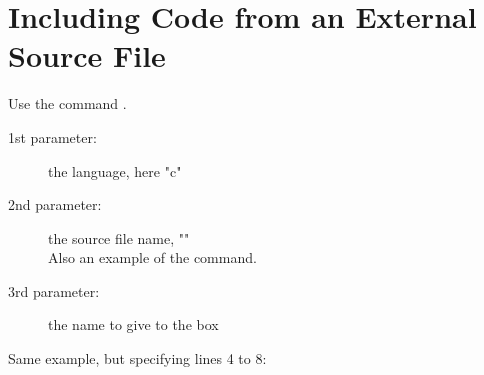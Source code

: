 \section{Including Code from an External Source File}

Use the command .
\begin{description}
	\item[1st parameter:] the language, here "c"
	\item[2nd parameter:] the source file name, ""\\ Also an example of the  command.
	\item[3rd parameter:] the name to give to the box
\end{description}



Same example, but specifying lines 4 to 8:
